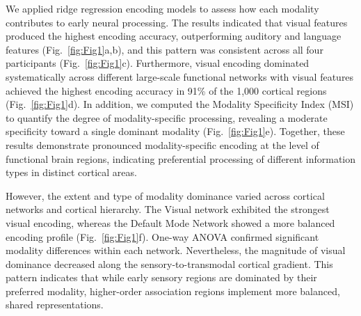 \documentclass[10pt,letterpaper]{article}
\begin{document}
We applied ridge regression encoding models to assess how each modality contributes to early neural processing. The results indicated that visual features produced the highest encoding accuracy, outperforming auditory and language features (Fig.~\ref{fig:Fig1}a,b), and this pattern was consistent across all four participants (Fig.~\ref{fig:Fig1}c). Furthermore, visual encoding dominated systematically across different large-scale functional networks with visual features achieved the highest encoding accuracy in 91\% of the 1,000 cortical regions (Fig.~\ref{fig:Fig1}d). In addition, we computed the Modality Specificity Index (MSI) to quantify the degree of modality-specific processing, revealing a moderate specificity toward a single dominant modality (Fig.~\ref{fig:Fig1}e). Together, these results demonstrate pronounced modality-specific encoding at the level of functional brain regions, indicating preferential processing of different information types in distinct cortical areas.

However, the extent and type of modality dominance varied across cortical networks and cortical hierarchy. The Visual network exhibited the strongest visual encoding, whereas the Default Mode Network showed a more balanced encoding profile (Fig.~\ref{fig:Fig1}f). One-way ANOVA confirmed significant modality differences within each network. Nevertheless, the magnitude of visual dominance decreased along the sensory-to-transmodal cortical gradient. This pattern indicates that while early sensory regions are dominated by their preferred modality, higher-order association regions implement more balanced, shared representations.
\end{document}
